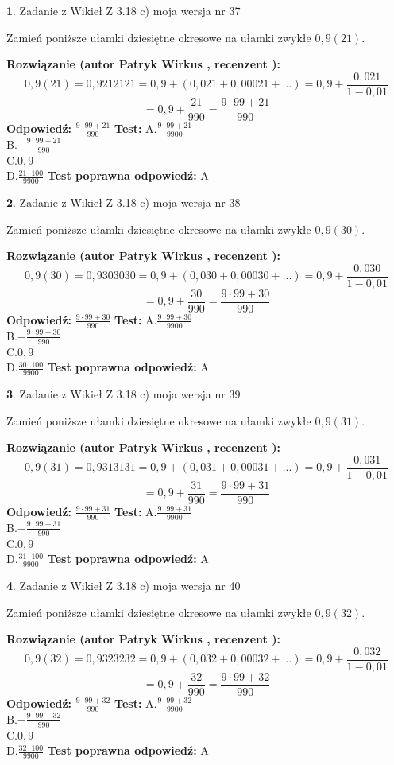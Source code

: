 \documentclass[12pt, a4paper]{article}
\theoremstyle{definition} %
\newtheorem{zad}{}
\newcommand{\zadStart}[1]{\begin{zad}#1\newline}
\newcommand{\zadStop}{\end{zad}}
\newcommand{\rozwStart}[2]{\noindent \textbf{Rozwiązanie (autor #1 , recenzent #2): }\newline}
\newcommand{\rozwStop}{\newline}
\newcommand{\odpStart}{\noindent \textbf{Odpowiedź:}\newline}
\newcommand{\odpStop}{\newline}
\newcommand{\testStart}{\noindent \textbf{Test:}\newline}
\newcommand{\testStop}{\newline}
\newcommand{\kluczStart}{\noindent \textbf{Test poprawna odpowiedź:}\newline}
\newcommand{\kluczStop}{\newline}
\begin{document}
\zadStart{Zadanie z Wikieł Z 3.18 c) moja wersja nr 37}

Zamień poniższe ułamki dziesiętne okresowe na ułamki zwykłe $0,9(21)$.
\zadStop
\rozwStart{Patryk Wirkus}{}
$$0,9(21)=0,9212121=0,9+(0,021+0,00021+...)=0,9+\frac{0,021}{1-0,01}$$
$$=0,9+\frac{21}{990}=\frac{9\cdot99+21}{990}$$
\rozwStop
\odpStart
$\frac{9\cdot99+21}{990}$
\odpStop
\testStart
A.$\frac{9\cdot99+21}{9900}$\\ B.$-\frac{9\cdot99+21}{990}$\\ C.$0,9$\\ D.$\frac{21\cdot100}{9900}$
\testStop
\kluczStart
A
\kluczStop



\zadStart{Zadanie z Wikieł Z 3.18 c) moja wersja nr 38}

Zamień poniższe ułamki dziesiętne okresowe na ułamki zwykłe $0,9(30)$.
\zadStop
\rozwStart{Patryk Wirkus}{}
$$0,9(30)=0,9303030=0,9+(0,030+0,00030+...)=0,9+\frac{0,030}{1-0,01}$$
$$=0,9+\frac{30}{990}=\frac{9\cdot99+30}{990}$$
\rozwStop
\odpStart
$\frac{9\cdot99+30}{990}$
\odpStop
\testStart
A.$\frac{9\cdot99+30}{9900}$\\ B.$-\frac{9\cdot99+30}{990}$\\ C.$0,9$\\ D.$\frac{30\cdot100}{9900}$
\testStop
\kluczStart
A
\kluczStop



\zadStart{Zadanie z Wikieł Z 3.18 c) moja wersja nr 39}

Zamień poniższe ułamki dziesiętne okresowe na ułamki zwykłe $0,9(31)$.
\zadStop
\rozwStart{Patryk Wirkus}{}
$$0,9(31)=0,9313131=0,9+(0,031+0,00031+...)=0,9+\frac{0,031}{1-0,01}$$
$$=0,9+\frac{31}{990}=\frac{9\cdot99+31}{990}$$
\rozwStop
\odpStart
$\frac{9\cdot99+31}{990}$
\odpStop
\testStart
A.$\frac{9\cdot99+31}{9900}$\\ B.$-\frac{9\cdot99+31}{990}$\\ C.$0,9$\\ D.$\frac{31\cdot100}{9900}$
\testStop
\kluczStart
A
\kluczStop



\zadStart{Zadanie z Wikieł Z 3.18 c) moja wersja nr 40}

Zamień poniższe ułamki dziesiętne okresowe na ułamki zwykłe $0,9(32)$.
\zadStop
\rozwStart{Patryk Wirkus}{}
$$0,9(32)=0,9323232=0,9+(0,032+0,00032+...)=0,9+\frac{0,032}{1-0,01}$$
$$=0,9+\frac{32}{990}=\frac{9\cdot99+32}{990}$$
\rozwStop
\odpStart
$\frac{9\cdot99+32}{990}$
\odpStop
\testStart
A.$\frac{9\cdot99+32}{9900}$\\ B.$-\frac{9\cdot99+32}{990}$\\ C.$0,9$\\ D.$\frac{32\cdot100}{9900}$
\testStop
\kluczStart
A
\kluczStop
\end{document}
